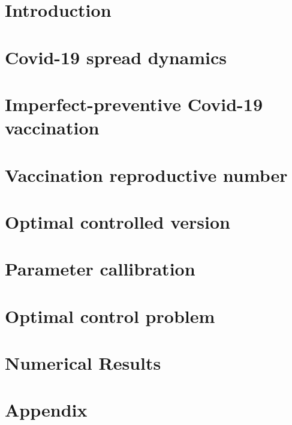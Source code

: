 \documentclass[5p, sort&compress]{elsarticle}
\begin{document}
  
  \section{Introduction}
    
  \section{Covid-19 spread dynamics}
    
  \section{Imperfect-preventive Covid-19 vaccination}
    
  \section{Vaccination reproductive number}
  \section{Optimal controlled version}
    
  \section{Parameter callibration}
    
  \section{Optimal control problem}
  \section{Numerical Results}   
  \appendix
  \section{Appendix}
    
  \nocite{*}
  
  
\end{document}
